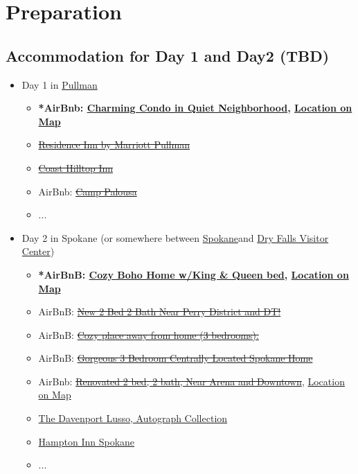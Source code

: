 \documentclass{article}
\newcommand{\Pullman}{\href{https://google.com}{Pullman}}
\newcommand{\Spokane}{\href{https://google.com}{Spokane}}
\newcommand{\DryFallsVisitorCenter}{\href{https://maps.app.goo.gl/ikKJMB3SaaTAfcYT9}{Dry Falls Visitor Center}}
\begin{document}
\section{Preparation}
\subsection{Accommodation for Day 1 and Day2 (TBD)}

\begin{itemize}
  \item{Day 1 in \Pullman}
  \begin{itemize}
    \item{\textbf{*AirBnb: \href{https://www.airbnb.com/rooms/38524859?adults=3&check_in=2024-05-18&check_out=2024-05-19}{Charming Condo in Quiet Neighborhood}, \href{https://maps.app.goo.gl/FeBiBENJo8RmT77B7}{Location on Map}}}
    \item{\href{https://maps.app.goo.gl/EwDjgqSxP142zTK69}{\sout{Residence Inn by Marriott Pullman}}}
    \item{\href{https://maps.app.goo.gl/W1NdB4NeXamTnb2G7}{\sout{Coast Hilltop Inn}}}
    \item{AirBnb: \href{https://www.airbnb.com/rooms/959047415867256733?adults=3&check_in=2024-05-18&check_out=2024-05-19}{\sout{Camp Palousa}}}
    \item{...}
  \end{itemize}
  \item{Day 2 in Spokane (or somewhere between \Spokane and \DryFallsVisitorCenter)}
  \begin{itemize}
    \item{\textbf{*AirBnB: \href{https://www.airbnb.com/rooms/630734250409085676?adults=3&check_in=2024-05-19&check_out=2024-05-20}{Cozy Boho Home w/King \& Queen bed}, \href{https://maps.app.goo.gl/bG2gE9wyuAM1cKMC9}{Location on Map}}}
    \item{AirBnB: \href{https://www.airbnb.com/rooms/550276139410529621?adults=3&check_in=2024-05-19&check_out=2024-05-20}{\sout{New 2 Bed 2 Bath Near Perry District and DT!}}}
    \item{AirBnB: \href{https://www.airbnb.com/rooms/802449944852130564?adults=3&check_in=2024-05-19&check_out=2024-05-20}{\sout{Cozy place away from home (3 bedrooms).}}}
    \item{AirBnB: \href{https://www.airbnb.com/rooms/619084546453426629?adults=3&check_in=2024-05-19&check_out=2024-05-20}{\sout{Gorgeous 3 Bedroom Centrally Located Spokane Home}}}
    \item{AirBnb: \href{https://www.airbnb.com/rooms/908205972491427939?adults=3&check_in=2024-05-19&check_out=2024-05-20}{\sout{Renovated 2 bed, 2 bath, Near Arena and Downtown}}, \href{https://maps.app.goo.gl/YyZHSUGSai8nPxxVA}{Location on Map}}
    \item{\href{https://maps.app.goo.gl/q4VfxJgmbbmMeNXL6}{The Davenport Lusso, Autograph Collection}}
    \item{\href{https://maps.app.goo.gl/Ca7z3rT2maDN9GnBA}{Hampton Inn Spokane}}
    \item{...}
  \end{itemize}
\end{itemize}
\end{document}
